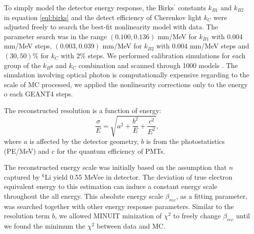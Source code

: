 To simply model the detector energy response, the Birks$^\prime$ constants $k_{B1}$ and $k_{B2}$ in equation \ref{eql:birks} and the detect efficiency of Cherenkov light $k_C$ were adjusted freely to search the best-fit nonlinearity model with data. 
The parameter search was in the range $(0.100, 0.136)$ mm/MeV for $k_{B1}$ with 0.004 mm/MeV steps, $(0.003, 0.039)$ mm/MeV for $k_{B2}$ with 0.004 mm/MeV steps and $(30, 50)\%$ for $k_C$ with $2\%$ steps. 
We performed calibration simulations for each group of the $k_B$s and $k_C$ combination and scanned through 1000 models .
The simulation involving optical photon is computationally expensive regarding to the scale of MC processed, we applied the nonlinearity corrections only to the energy o each GEANT4 steps.

\label{sec:resolution}
The reconstructed resolution is a function of energy:
\begin{equation}
\label{eql:resolution}
    \frac{\sigma}{E} = \sqrt{a^2 + \frac{b^2}{E}+\frac{c^2}{E^2}},
\end{equation}
where $a$ is affected by the detector geometry, $b$ is from the photostatistics (PE/MeV) and $c$ for the quantum efficiency of PMTs.


\label{sec:other}
The reconstructed energy scale was initially based on the assumption that $n$ captured by $^6$Li yield 0.55 MeVee in detector. 
The deviation of true electron equivalent energy to this estimation can induce a constant energy scale throughout the all energy. 
This absolute energy scale $\beta_{rec}$, as a fitting parameter, was searched together with other energy response parameters.
Similar to the resolution term $b$, we allowed MINUIT minization of $\chi^2$ to freely change $\beta_{rec}$ until we found the minimum the $\chi^2$ between data and MC.

